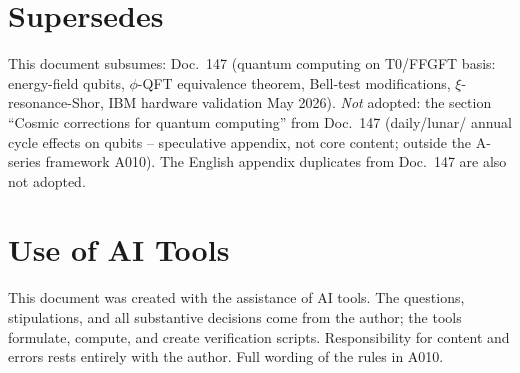 \section{Supersedes}

This document subsumes: Doc.~147 (quantum computing on T0/FFGFT basis:
energy-field qubits, $\phi$-QFT equivalence theorem, Bell-test modifications,
$\xi$-resonance-Shor, IBM hardware validation May 2026). \emph{Not} adopted:
the section ``Cosmic corrections for quantum computing'' from Doc.~147 (daily/lunar/
annual cycle effects on qubits -- speculative appendix, not core content;
outside the A-series framework A010). The English appendix duplicates from
Doc.~147 are also not adopted.

\section{Use of AI Tools}

This document was created with the assistance of AI tools. The questions,
stipulations, and all substantive decisions come from the author; the tools
formulate, compute, and create verification scripts.
Responsibility for content and errors rests entirely with the author.
Full wording of the rules in A010.

